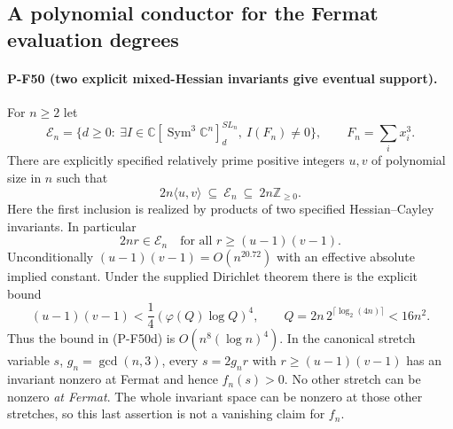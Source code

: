 \documentclass[11pt,a4paper]{article}
\begin{document}
\subsection{A polynomial conductor for the Fermat evaluation degrees}
\label{sec:fermat-conductor}

\paragraph{P-F50 (two explicit mixed-Hessian invariants give eventual support).}
For $n\ge2$ let
\[
 \mathscr E_n=\{d\ge0:\ \exists I\in
     \mathbb C[\operatorname{Sym}^3\mathbb C^n]^{SL_n}_d,
                           \ I(F_n)\ne0\},
      \qquad F_n=\sum_i x_i^3.                         \tag{P-F50a}
\]
There are explicitly specified relatively prime positive
integers $u,v$ of polynomial size in $n$ such that
\[
          2n\langle u,v\rangle\ \subseteq\ \mathscr E_n
                         \ \subseteq\ 2n\mathbb Z_{\ge0}.
                                                        \tag{P-F50b}
\]
Here the first inclusion is realized by products of two
specified Hessian--Cayley invariants. In particular
\[
               2nr\in\mathscr E_n
             \quad\text{for all }r\ge (u-1)(v-1).
                                                        \tag{P-F50c}
\]
Unconditionally $(u-1)(v-1)=O(n^{20.72})$ with an
effective absolute implied constant. Under the supplied
Dirichlet theorem there is the explicit bound
\[
 (u-1)(v-1)<\frac14(\varphi(Q)\log Q)^4,
 \qquad Q=2n\,2^{\lceil\log_2(4n)\rceil}<16n^2.
                                                        \tag{P-F50d}
\]
Thus the bound in (P-F50d) is $O(n^8(\log n)^4)$.
In the canonical stretch variable $s$, $g_n=\gcd(n,3)$,
every $s=2g_nr$ with $r\ge(u-1)(v-1)$ has an invariant
nonzero at Fermat and hence $f_n(s)>0$.
No other stretch can be nonzero \emph{at Fermat}.
The whole invariant space can be nonzero at those other
stretches, so this last assertion is not a vanishing
claim for $f_n$.
\end{document}
